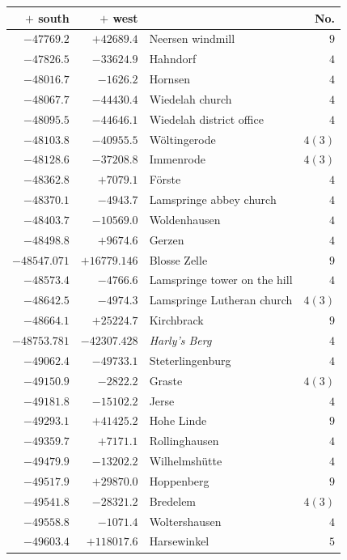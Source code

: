 \clearpage{}%
\begin{center}\begingroup\fontsize{8}{9}\selectfont
\setlength{\tabcolsep}{4pt}
\begin{tabular}{r|r|p{170pt}|r}\hline
\(+\) south&\(+\) west&&No.\\\hline
\(-47769.2\)&\(+42689.4\)&Neersen windmill&\(9\)\\
\(-47826.5\)&\(-33624.9\)&Hahndorf&\(4\)\\
\(-48016.7\)&\(-1626.2\)&Hornsen&\(4\)\\
\(-48067.7\)&\(-44430.4\)&Wiedelah church&\(4\)\\
\(-48095.5\)&\(-44646.1\)&Wiedelah district office&\(4\)\\
\(-48103.8\)&\(-40955.5\)&Wöltingerode&\(4 (3)\)\\
\(-48128.6\)&\(-37208.8\)&Immenrode&\(4 (3)\)\\
\(-48362.8\)&\(+7079.1\)&Förste&\(4\)\\
\(-48370.1\)&\(-4943.7\)&Lamspringe abbey church&\(4\)\\
\(-48403.7\)&\(-10569.0\)&Woldenhausen&\(4\)\\
\(-48498.8\)&\(+9674.6\)&Gerzen&\(4\)\\
\(-48547.071\)&\(+16779.146\)&Blosse Zelle&\(9\)\\
\(-48573.4\)&\(-4766.6\)&Lamspringe tower on the hill&\(4\)\\
\(-48642.5\)&\(-4974.3\)&Lamspringe Lutheran church&\(4 (3)\)\\
\(-48664.1\)&\(+25224.7\)&Kirchbrack&\(9\)\\
\(-48753.781\)&\(-42307.428\)&\textit{Harly’s Berg}&\(4\)\\
\(-49062.4\)&\(-49733.1\)&Steterlingenburg&\(4\)\\
\(-49150.9\)&\(-2822.2\)&Graste&\(4 (3)\)\\
\(-49181.8\)&\(-15102.2\)&Jerse&\(4\)\\
\(-49293.1\)&\(+41425.2\)&Hohe Linde&\(9\)\\
\(-49359.7\)&\(+7171.1\)&Rollinghausen&\(4\)\\
\(-49479.9\)&\(-13202.2\)&Wilhelmshütte&\(4\)\\
\(-49517.9\)&\(+29870.0\)&Hoppenberg&\(9\)\\
\(-49541.8\)&\(-28321.2\)&Bredelem&\(4 (3)\)\\
\(-49558.8\)&\(-1071.4\)&Woltershausen&\(4\)\\
\(-49603.4\)&\(+118017.6\)&Harsewinkel&\(5\)\\

\end{tabular}
\end{center}
